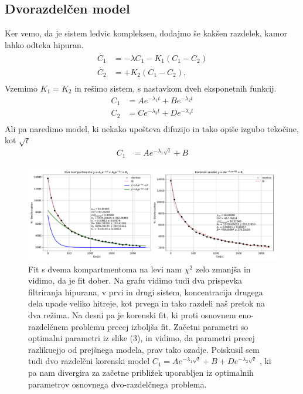 \documentclass[11pt, a4paper]{article}
\begin{document}
\subsection{Dvorazdelčen model}
Ker vemo, da je sistem ledvic kompleksen, dodajmo še kakšen razdelek, kamor lahko odteka hipuran.
\begin{equation}
\begin{split}
\dot{C_1} &= -\lambda C_1 -K_1 (C_1 - C_2) \\
\dot{C_2} &= +K_2 (C_1 - C_2), \\
\end{split}
\end{equation}
Vzemimo $K_1 = K_2$ in rešimo sistem, s nastavkom dveh eksponetnih funkcij.
\begin{equation}
\begin{split}
C_1 &= A e^{-\lambda_1 t} + B e^{-\lambda_2 t} \\ 
C_2 &= C e^{-\lambda_3 t} + D e^{-\lambda_4 t} \\ 
\end{split}
\end{equation}
Ali pa naredimo model, ki nekako upošteva difuzijo in tako opiše izgubo tekočine, kot $\sqrt{t}$
\begin{equation}
\begin{split}
C_1 &= A e^{-\lambda_1 \sqrt{t}} +B
\end{split}
\end{equation}
 \begin{figure}[H]
\hspace*{-2.5cm}     
  \includegraphics[width=20.cm] {druga_dva_kompartmenta.pdf}
 \caption{Fit s dvema kompartmentoma na levi nam $\chi^2$ zelo zmanjša in vidimo, da je fit dober. Na grafu vidimo tudi dva prispevka filtriranja hipurana, v prvi in drugi sistem, koncentracija drugega dela upade veliko hitreje, kot prvega in tako razdeli naš pretok na dva režima. Na desni pa je korenski fit, ki proti osnovnem eno-razdelčnem problemu precej izboljša fit. Začetni parametri so optimalni parametri iz slike (3), in vidimo, da parametri precej razlikuejjo od prejšnega modela, prav tako ozadje.  Poiskusil sem tudi dvo razdelčni korenski model $C_1 = A e^{-\lambda_1 \sqrt{t}} +B+  D e^{-\lambda_2 \sqrt{t}}$ , ki pa nam divergira za začetne približek uporabljen iz optimalnih parametrov osnovnega dvo-razdelčnega problema.}
\end{figure}
\end{document}
